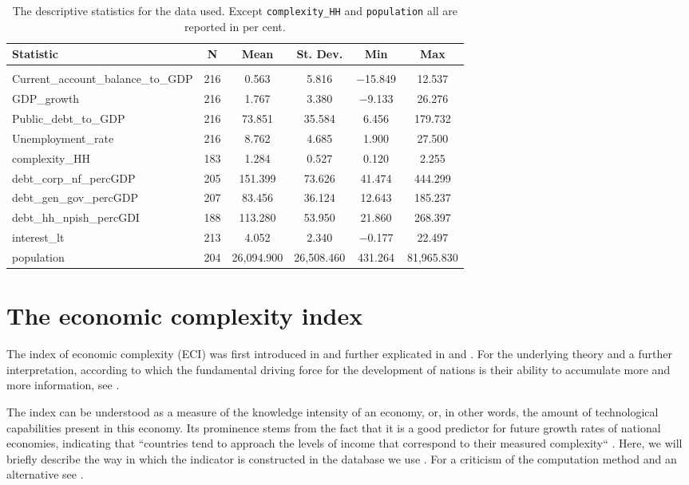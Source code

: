 \documentclass[11pt,a4paper]{article}
\begin{document}
\begin{table}[!htbp] 
\centering 
\begin{tabular}{@{\extracolsep{5pt}}lccccc} 
\toprule 
\textbf{Statistic} & \multicolumn{1}{c}{\textbf{N}} & \multicolumn{1}{c}{\textbf{Mean}} & \multicolumn{1}{c}{\textbf{St. Dev.}} & \multicolumn{1}{c}{\textbf{Min}} & \multicolumn{1}{c}{\textbf{Max}} \\ 
\hline \\[-1.8ex] 
Current\_account\_balance\_to\_GDP & 216 & 0.563 & 5.816 & $-$15.849 & 12.537 \\ 
GDP\_growth & 216 & 1.767 & 3.380 & $-$9.133 & 26.276 \\ 
Public\_debt\_to\_GDP & 216 & 73.851 & 35.584 & 6.456 & 179.732 \\ 
Unemployment\_rate & 216 & 8.762 & 4.685 & 1.900 & 27.500 \\ 
complexity\_HH & 183 & 1.284 & 0.527 & 0.120 & 2.255 \\ 
debt\_corp\_nf\_percGDP & 205 & 151.399 & 73.626 & 41.474 & 444.299 \\ 
debt\_gen\_gov\_percGDP & 207 & 83.456 & 36.124 & 12.643 & 185.237 \\ 
debt\_hh\_npish\_percGDI & 188 & 113.280 & 53.950 & 21.860 & 268.397 \\  
interest\_lt & 213 & 4.052 & 2.340 & $-$0.177 & 22.497 \\ 
population & 204 & 26,094.900 & 26,508.460 & 431.264 & 81,965.830 \\ 
\bottomrule
\end{tabular} 
\caption{The descriptive statistics for the data used. Except \texttt{complexity\_HH} and \texttt{population} all are reported in per cent.}  \label{tab:desc-stats} 
\end{table}

\newpage

\section{The economic complexity index}
\label{ap:eci}
The index of economic complexity (ECI) was first introduced in \citet{Hidalgo:2007cp} and further explicated in \citet{Hidalgo:2009be} and \citet{Hausmann:2013vj}.
For the underlying theory and a further interpretation, according to which the fundamental driving force for the development of nations is their ability to accumulate more and more information, see \citet{Hidalgo:2015vs}.

The index can be understood as a measure of the knowledge intensity of an economy, or, in other words, the amount of technological capabilities present in this economy. 
Its prominence stems from the fact that it is a good predictor for future growth rates of national economies, indicating that ``countries tend to approach the levels of income that correspond to their measured complexity`` \citep[p. 10574]{Hidalgo:2009be}.
Here, we will briefly describe the way in which the indicator is constructed in the database we use \citep{AtlasData}. 
For a criticism of the computation method and an alternative see \citet{Cristelli:2013hj}.
\end{document}
